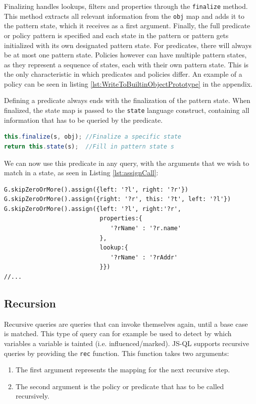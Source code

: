  Finalizing handles lookups, filters and properties through the \texttt{finalize} method. This method extracts all relevant information from the \texttt{obj} map and adds it to the pattern state, which it receives as a first argument. Finally, the full predicate or policy pattern is specified and each state in the pattern or pattern gets initialized with its own designated pattern state. For predicates, there will always be at most one pattern state. Policies however can have multiple pattern states, as they represent a sequence of states, each with their own pattern state. This is the only characteristic in which predicates and policies differ. An example of a policy can be seen in listing \ref{lst:WriteToBuiltinObjectPrototype} in the appendix.

\begin{exmp}
\label{ex:predicateFinalize}
Defining a predicate always ends with the finalization of the pattern state. When finalized, the state map is passed to the \texttt{state} language construct, containing all information that has to be queried by the predicate.
\begin{lstlisting}[label={lst:predicateFinalize},language=JavaScript, caption=Finalizing the \texttt{assign} predicate,mathescape=true]
this.finalize(s, obj); //Finalize a specific state
return this.state(s);  //Fill in pattern state s
\end{lstlisting}

\end{exmp}

We can now use this predicate in any query, with the arguments that we wish to match in a state, as seen in Listing \ref{lst:assignCall}:

\begin{lstlisting}[label={lst:assignCall},language=JSQL, caption=Using the \texttt{assign} predicate,mathescape=true]
G.skipZeroOrMore().assign({left: '?l', right: '?r'})
G.skipZeroOrMore().assign({right: '?r', this: '?t', left: '?l'})
G.skipZeroOrMore().assign({left: '?l', right:'?r',
                           properties:{
                              '?rName' : '?r.name'
                           },
                           lookup:{
                              '?rName' : '?rAddr'
                           }}) 
//...
\end{lstlisting}

\subsection{Recursion}
 Recursive queries are queries that can invoke themselves again, until a base case is matched. This type of query can for example be used to detect by which variables a variable is tainted (i.e. influenced/marked). JS-QL supports recursive queries by providing the \texttt{rec} function. This function takes two arguments: 
\begin{enumerate}
\item The first argument represents the mapping for the next recursive step.
\item The second argument is the policy or predicate that has to be called recursively.
\end{enumerate}

